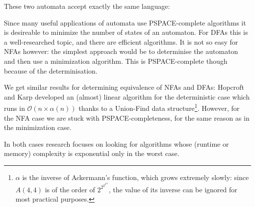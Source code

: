 \begin{example}
  These two automata accept exactly the same language:\\
  \center
\end{example}

Since many useful applications of automata use PSPACE-complete algorithms it
is desireable to minimize the number of states of an automaton.
For DFAs this is a well-researched topic, and there are efficient algorithms.
It is not so easy for NFAs however: the simplest approach would be to
determinise the automaton and then use a minimization algorithm.
This is PSPACE-complete though because of the determinisation.

We get similar results for determining equivalence of NFAs and DFAs:
Hopcroft and Karp developed an (almost) linear algorithm for the deterministic
case which runs in $\mathcal{O}(n \times \alpha(n))$ thanks to a
Union-Find data structure\footnote{$\alpha$ is the inverse of Ackermann's
function, which grows extremely slowly: since $A(4, 4)$ is of the order of
$2^{2^{2^{2^{16}}}}$, the value of its inverse can be ignored for
most practical purposes.}.
However, for the NFA case we are stuck with PSPACE-completeness, for the same
reason as in the minimization case.

In both cases research focuses on looking for algorithms whose
(runtime or memory) complexity is exponential only in the worst case.

